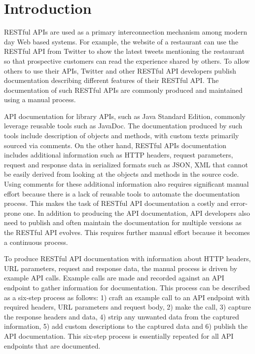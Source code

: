 \documentclass[conference]{IEEEtran}
\begin{document}
\section{Introduction}
RESTful APIs are used as a primary interconnection mechanism among modern day Web based systems. For example, the website of a restaurant can use the RESTful API from Twitter to show the latest tweets mentioning the restaurant so that prospective customers can read the experience shared by others. To allow others to use their APIs, Twitter and other RESTful API developers publish documentation describing different features of their RESTful API. The documentation of such RESTful APIs are commonly produced and maintained using a manual process.

API documentation for library APIs, such as Java Standard Edition, commonly leverage reusable tools such as JavaDoc. The documentation produced by such tools include description of objects and methods, with custom texts primarily sourced via comments. On the other hand, RESTful APIs documentation includes additional information such as HTTP headers, request parameters, request and response data in serialized formats such as JSON, XML that cannot be easily derived from looking at the objects and methods in the source code. Using comments for these additional information also requires significant manual effort because there is a lack of reusable tools to automate the documentation process. This makes the task of RESTful API documentation a costly and error-prone one. In addition to producing the API documentation, API developers also need to publish and often maintain the documentation for multiple versions as the RESTful API evolves. This requires further manual effort because it becomes a continuous process.

To produce RESTful API documentation with information about HTTP headers, URL parameters, request and response data, the manual process is driven by example API calls. Example calls are made and recorded against an API endpoint to gather information for documentation. This process can be described as a six-step process as follows: 1) craft an example call to an API endpoint with required headers, URL parameters and request body, 2) make the call, 3) capture the response headers and data, 4) strip any unwanted data from the captured information, 5) add custom descriptions to the captured data and 6) publish the API documentation. This six-step process is essentially repeated for all API endpoints that are documented.
\end{document}
